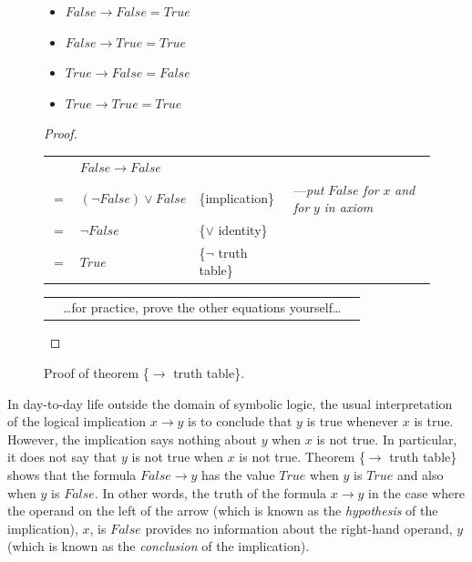 \begin{figure}
\begin{theorem}
\mbox{}
\begin{itemize}
\item $False \rightarrow False = True$
\item $False \rightarrow True  = True$
\item $True  \rightarrow False = False$
\item $True  \rightarrow True  = True$
\end{itemize}
\end{theorem}

\begin{proof}
\mbox{} \\
\begin{tabular}{llll}
    & $False \rightarrow False$        & \\
$=$ & $(\neg False) \vee False$        & \{implication\} &---\emph{put} $False$ \emph{for} $x$ \emph{and for} $y$ \emph{in axiom}\\
$=$ & $\neg False$                     & \{$\vee$ identity\}\\
$=$ & $True$                           & \{$\neg$ truth table\}\\
\end{tabular}

\begin{tabular}{lll}
& \dots for practice, prove the other equations yourself\dots & \\
\end{tabular}

\end{proof}
\caption{Proof of theorem \{$\rightarrow$ truth table\}.}
\label{implication-truth-table}
\end{figure}

In day-to-day life outside the domain of symbolic logic,
the usual interpretation of the logical implication $x \rightarrow y$
is to conclude that $y$ is true whenever
$x$ is true. However, the implication says nothing
about $y$ when $x$ is not true. In particular, it
does not say that $y$ is not true when $x$ is not true.
Theorem \{$\rightarrow$ truth table\} shows that the
formula $False \rightarrow y$ has the value $True$ when $y$ is $True$
and also when $y$ is $False$.
In other words, the truth of the formula $x \rightarrow y$ in the case
where the operand on the left of the arrow (which is known as the
\emph{hypothesis}
of the implication), $x$, is $False$ provides
no information about the right-hand operand, $y$ (which is known as the
\emph{conclusion}
of the implication).

